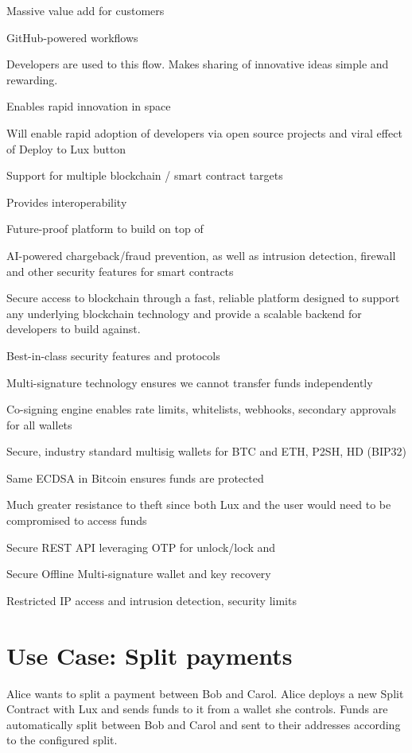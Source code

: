 \documentclass[11pt]{article}
\begin{document}
Massive value add for customers


GitHub-powered workflows


Developers are used to this flow. Makes sharing of innovative ideas simple and rewarding.


Enables rapid innovation in space


Will enable rapid adoption of developers via open source projects and viral effect of Deploy to Lux button


Support for multiple blockchain / smart contract targets


Provides interoperability


Future-proof platform to build on top of


AI-powered chargeback/fraud prevention, as well as intrusion detection, firewall and other security features for smart contracts


Secure access to blockchain through a fast, reliable platform designed to support any underlying blockchain technology and provide a scalable backend for developers to build against.


Best-in-class security features and protocols


Multi-signature technology ensures we cannot transfer funds independently


Co-signing engine enables rate limits, whitelists, webhooks, secondary approvals for all wallets


Secure, industry standard multisig wallets for BTC and ETH, P2SH, HD (BIP32)


Same ECDSA in Bitcoin ensures funds are protected


Much greater resistance to theft since both Lux and the user would need to be compromised to access funds


Secure REST API leveraging OTP for unlock/lock and


Secure Offline Multi-signature wallet and key recovery


Restricted IP access and intrusion detection, security limits


\section{Use Case: Split payments}

Alice wants to split a payment between Bob and Carol. Alice deploys a new Split Contract with Lux and sends funds to it from a wallet she controls. Funds are automatically split between Bob and Carol and sent to their addresses according to the configured split.
\end{document}
